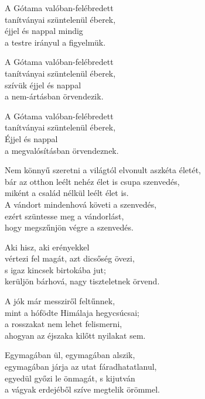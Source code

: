 \begin{dhpverse}

 A Gótama valóban-felébredett\\
tanítványai szüntelenül éberek,\\
éjjel és nappal mindig\\
a testre irányul a figyelmük.

 A Gótama valóban-felébredett\\
tanítványai szüntelenül éberek,\\
szívük éjjel és nappal\\
a nem-ártásban örvendezik.

 A Gótama valóban-felébredett\\
tanítványai szüntelenül éberek,\\
Éjjel és nappal\\
a megvalósításban örvendeznek.

 Nem könnyű szeretni a világtól elvonult aszkéta életét,\\
bár az otthon leélt nehéz élet is csupa szenvedés,\\
miként a család nélkül leélt élet is.\\
A vándort mindenhová követi a szenvedés,\\
ezért szüntesse meg a vándorlást,\\
hogy megszűnjön végre a szenvedés.

 Aki hisz, aki erényekkel\\
vértezi fel magát, azt dicsőség övezi,\\
s igaz kincsek birtokába jut;\\
kerüljön bárhová, nagy tiszteletnek örvend.

\end{dhpverse}
\newpage
\begin{dhpverse}

 A jók már messziről feltűnnek,\\
mint a hófödte Himálaja hegycsúcsai;\\
a rosszakat nem lehet felismerni,\\
ahogyan az éjszaka kilőtt nyilakat sem.

 Egymagában ül, egymagában alszik,\\
egymagában járja az utat fáradhatatlanul,\\
egyedül győzi le önmagát, s kijutván\\
a vágyak erdejéből szíve megtelik örömmel.

\end{dhpverse}
